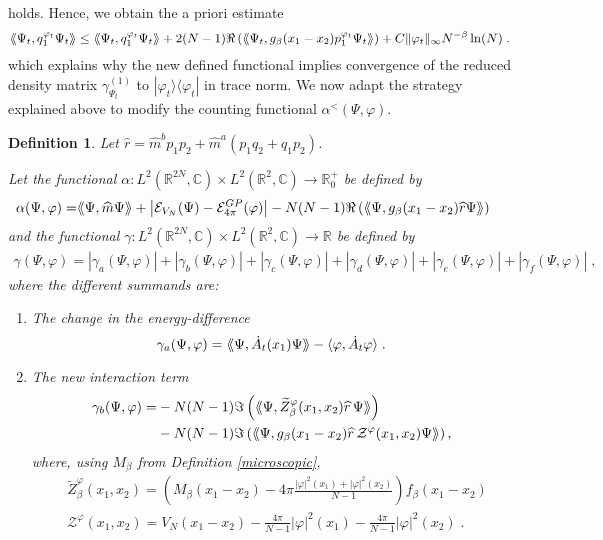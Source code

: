 \documentclass[11pt, english, american]{article}
\newcommand{\laa}{\langle\hspace{-0.08cm}\langle}
\newcommand{\raa}{\rangle\hspace{-0.08cm}\rangle}
\newcommand{\LZ}{L^2(\mathbb{R}^2,\mathbb{C})}
\newcommand{\LZN}{L^2(\mathbb{R}^{2N},\mathbb{C})}
\newtheorem{definition}[theorem] {Definition}
\renewcommand{\phi}{\varphi}
\newcommand{\potdiffneu}{\widetilde{Z}_{\beta}}
\newcommand{\asa}{\gamma_a}
\newcommand{\as}{\gamma_b}
\newcommand{\bs}{\gamma_c}
\newcommand{\cs}{\gamma_d}
\newcommand{\ds}{\gamma_e}
\begin{document}
holds.
Hence, we obtain the a priori estimate
 $$
 \laa\Psi_t,q^{\phi_t}_1\Psi_t\raa
 \leq
 \laa\Psi_t,q^{\phi_t}_1\Psi_t\raa+2(N-1)\Re\left(\laa\Psi_t
, g_{\beta}(x_{1}-x_{2}) p^{\phi_t}_1
\Psi_t\raa\right) 
+
 C
\|\phi_t\|_\infty
N^{-\beta} \ln(N)
\;.
$$
which explains why the new defined functional implies convergence of the reduced density matrix
 $\gamma^{(1)}_{\Psi_t}$ to $|\phi_t \rangle \langle \phi_t|$ in trace norm.
We now adapt the strategy explained above to modify the counting functional
$\alpha^< (\Psi, \phi)$.
\begin{definition}\label{lambda1}
Let $\widehat{r}=\widehat{m}^b p_{1}p_{2}+\widehat{m}^a(p_{1}q_{2}+q_1p_2)$.

Let the functional $\alpha:\LZN\times\LZ\to\mathbb{R}^+_0$ be defined by 
\begin{align} \label{alphafuerV}
\alpha(\Psi,\phi) =&
%
\laa \Psi, \widehat{m} \Psi \raa
+
\left|
\mathcal{E}_{V_N} (\Psi)
-
\mathcal{E}^{GP}_{4 \pi} (\phi)
\right|
%
-N(N-1)\Re\left(\laa\Psi
, g_{\beta}(x_{1}-x_{2}) \widehat{r}
\Psi\raa\right)
 \end{align}
and the functional $\gamma:\LZN\times\LZ\to\mathbb{R} $ be defined by
\begin{align} \label{gamma fuer V}
\gamma(\Psi,\phi)=|\asa (\Psi,\phi)|+|\as (\Psi,\phi)|+|\bs (\Psi,\phi)|+|\cs (\Psi,\phi)|+|\ds (\Psi,\phi)|
+
|\gamma_f (\Psi, \phi)|
\;,
\end{align}
where the different summands are:
\begin{enumerate}
\item[(a)] The change in the energy-difference
$$\asa (\Psi,\phi)=\laa\Psi,\dot A_t(x_1)\Psi\raa-\langle\phi,\dot A_t\phi\rangle\;.$$
\item [(b)] The new interaction term
\begin{align*}\as (\Psi,\phi)=&-N(N-1)\Im\left(\laa\Psi ,
\potdiffneu^\phi(x_1,x_2)\widehat{r}\,
\Psi\raa\right)\\&
%
-N(N-1)\Im\left(\laa\Psi ,g_{\beta}(x_{1}-x_{2})
\widehat{r}\,\mathcal{Z}^\phi(x_1,x_2) \Psi\raa\right),
%
\end{align*}
where, using $M_\beta$ from Definition \ref{microscopic},
 \begin{align}
 \label{defzz}
 &\potdiffneu^\phi(x_1,x_2)=\left(M_{\beta}(x_1-x_2) - 4 \pi\frac{|\phi|^2(x_1)+|\phi|^2(x_2)}{N-1}\right)f_{\beta}(x_{1}-x_{2})
\\ 
 &
 \nonumber 
 \mathcal{Z}^\phi(x_1,x_2)=
 V_N(x_1-x_2)- 
 \frac{4  \pi}{N-1} |\phi|^ 2(x_1)
 -
  \frac{4 \pi}{N-1} |\phi|^ 2(x_2)
 \;.
\end{align}




\end{enumerate}
\end{definition}
\end{document}
